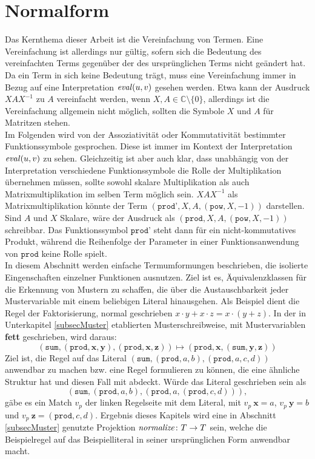 



\chapter {Normalform} \label{secErsteNormalform}

Das Kernthema dieser Arbeit ist die Vereinfachung von Termen. Eine Vereinfachung ist allerdings nur gültig, sofern sich die Bedeutung des vereinfachten Terms gegenüber der des ursprünglichen Terms nicht geändert hat. Da ein Term in sich keine Bedeutung trägt, muss eine Vereinfachung immer in Bezug auf eine Interpretation $\mathit{eval}(u, v)$ gesehen werden. Etwa kann der Ausdruck $X A X^{-1}$ zu $A$ vereinfacht werden, wenn $X, A \in \mathbb{C} \setminus \{0\}$, allerdings ist die Vereinfachung allgemein nicht möglich, sollten die Symbole $X$ und $A$ für Matritzen stehen. \\
Im Folgenden wird von der Assoziativität oder Kommutativität bestimmter Funktionssymbole gesprochen. Diese ist immer im Kontext der Interpretation $\mathit{eval}(u, v)$ zu sehen. Gleichzeitig ist aber auch klar, dass unabhängig von der Interpretation verschiedene Funktionssymbole die Rolle der Multiplikation übernehmen müssen, sollte sowohl skalare Multiplikation als auch Matrixmultiplikation im selben Term möglich sein. $X A X^{-1}$ als Matrixmultiplikation könnte der Term $(\texttt{prod'}, X, A, (\texttt{pow}, X, -1))$ darstellen. Sind $A$ und $X$ Skalare, wäre der Ausdruck als $(\texttt{prod}, X, A, (\texttt{pow}, X, -1))$ schreibbar. Das Funktionssymbol $\texttt{prod'}$ steht dann für ein nicht-kommutatives Produkt, während die Reihenfolge der Parameter in einer Funktionsanwendung von $\texttt{prod}$ keine Rolle spielt.\\

In diesem Abschnitt werden einfache Termumformungen beschrieben, die isolierte Eingenschaften einzelner Funktionen ausnutzen. Ziel ist es, Äquivalenzklassen für die Erkennung von Mustern zu schaffen, die über die Austauschbarkeit jeder Mustervariable mit einem beliebigen Literal hinausgehen. Als Beispiel dient die Regel der Faktorisierung, normal geschrieben $x \cdot y + x \cdot z = x \cdot (y + z)$. In der in Unterkapitel \ref{subsecMuster} etablierten Musterschreibweise, mit Mustervariablen \textbf{fett} geschrieben, wird daraus:
$$(\texttt{sum}, (\texttt{prod}, \mathbf x, \mathbf y), (\texttt{prod}, \mathbf x, \mathbf z)) \mapsto (\texttt{prod}, \mathbf x, (\texttt{sum}, \mathbf y, \mathbf z))$$
Ziel ist, die Regel auf das Literal $(\texttt{sum}, (\texttt{prod}, a, b), (\texttt{prod}, a, c, d))$ anwendbar zu machen bzw. eine Regel formulieren zu können, die eine ähnliche Struktur hat und diesen Fall mit abdeckt. 
Würde das Literal geschrieben sein als $$(\texttt{sum}, (\texttt{prod}, a, b), (\texttt{prod}, a, (\texttt{prod}, c, d))),$$ gäbe es ein Match $v_p$ der linken Regelseite mit dem Literal, mit $v_p~\mathbf x = a$, $v_p~\mathbf y = b$ und $v_p~\mathbf z = (\texttt{prod}, c, d)$. Ergebnis dieses Kapitels wird eine in Abschnitt \ref{subsecMuster} genutzte Projektion ${\mathit{normalize} \colon T \rightarrow T}$ sein, welche die Beispielregel auf das Beispielliteral in seiner ursprünglichen Form anwendbar macht.\\

